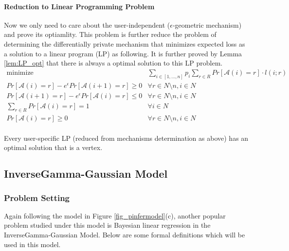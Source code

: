 \documentclass{article}
\begin{document}
\paragraph{Reduction to Linear Programming Problem}
Now we only need to care about the user-independent ($\epsilon$-geometric mechanism) and prove its optiamlity. 
This problem is further reduce
the problem of determining the differentially private mechanism that minimizes expected loss
as a solution to a linear program (LP) as following. It is further proved by Lemma \ref{lem:LP_opt} that there is always a optimal solution to this LP problem.
%
\[
    \begin{array}{rl}
    \mbox{minimize} 
    & \sum_{i \in [1,\ldots, n]}p_i \sum_{r \in R}
    Pr[\mathcal{A}(i) = r] \cdot l(i;r)\\
    Pr[\mathcal{A}(i) = r]  
    - e^{\epsilon}Pr[\mathcal{A}(i + 1) = r] \geq 0
    & \forall r \in N \setminus {n}, i \in N\\
    Pr[\mathcal{A}(i + 1) = r]  
    - e^{\epsilon}Pr[\mathcal{A}(i) = r] \leq 0
    & \forall r \in N \setminus {n}, i \in N\\
    \sum_{r \in R}
    Pr[\mathcal{A}(i) = r] = 1
    & \forall i \in N\\
    Pr[\mathcal{A}(i) = r] \geq 0
    & \forall r \in N \setminus {n}, i \in N\\    
    \end{array}
\]
%
\begin{lem}
\label{lem:LP_opt}
Every user-specific LP (reduced from mechanisms determination as above) has an optimal solution that is a vertex.
\end{lem}

\subsection{InverseGamma-Gaussian Model
\texorpdfstring{\cite{bernstein2019differentially}}{}}
%
\subsubsection{Problem Setting}
%
Again following the model in Figure \ref{fig_pinfermodel}(c), another popular problem studied under this model is Bayesian linear regression in the InverseGamma-Gaussian Model. 
%
Below are some formal definitions which will be used in this model.
\end{document}
